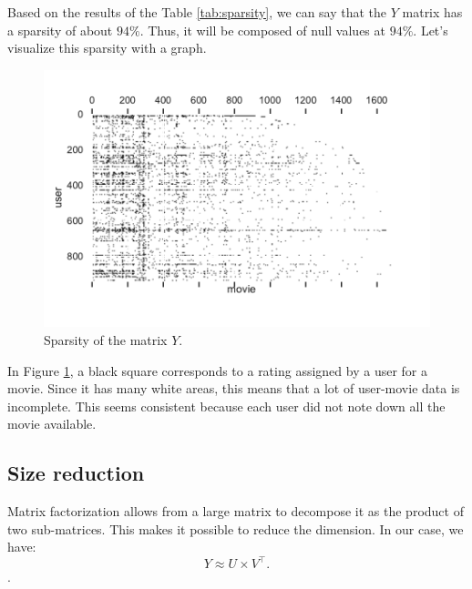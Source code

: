 \documentclass{article}
\begin{document}
Based on the results of the Table \ref{tab:sparsity}, we can say that the $Y$ matrix has a sparsity of about $94\%$. Thus, it will be composed of null values at $94\%$. Let’s visualize this sparsity with a graph.
\begin{figure}[H]
\centering
  \includegraphics[scale=0.68]{./images/sparse.pdf}
  \caption{Sparsity of the matrix $Y$.}
  \label{fig:sparse_fig}
\end{figure}

In Figure \ref{fig:sparse_fig}, a black square corresponds to a rating assigned by a user for a movie. Since it has many white areas, this means that a lot of user-movie data is incomplete. This seems consistent because each user did not note down all the movie available.

\subsection{Size reduction}
Matrix factorization allows from a large matrix to decompose it as the product of two sub-matrices. This makes it possible to reduce the dimension. In our case, we have:
$$Y \approx U\times V^{\top}.$$.
\end{document}
